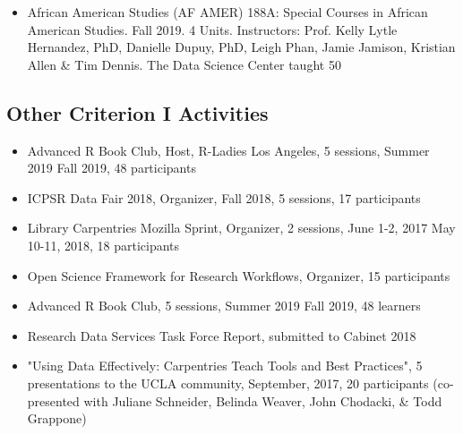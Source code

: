 \begin{itemize}[label={},leftmargin=!,labelindent=5pt,itemindent=-15pt]
    \item African American Studies (AF AMER) 188A: Special Courses in African American Studies. Fall 2019. 4 Units. Instructors: Prof. Kelly Lytle Hernandez, PhD, Danielle Dupuy, PhD, Leigh Phan, Jamie Jamison, Kristian Allen \& Tim Dennis. The Data Science Center taught 50%
\end{itemize}

\subsection{Other Criterion I Activities}
\begin{itemize}[label={},leftmargin=!,labelindent=5pt,itemindent=-15pt]
  \item Advanced R Book Club, Host, R-Ladies Los Angeles, 5 sessions, Summer 2019 \textbar Fall 2019,	48 participants
  \item ICPSR Data Fair 2018, Organizer, Fall 2018, 5 sessions, 17 participants
  \item Library Carpentries Mozilla Sprint, Organizer, 2 sessions, June 1-2, 2017 \textbar May 10-11, 2018, 18 participants
  \item Open Science Framework for Research Workflows, Organizer, 15 participants
  \item Advanced R Book Club, 5 sessions, Summer 2019 \textbar Fall 2019,	48 learners
  \item Research Data Services Task Force Report, submitted to Cabinet 2018
  \item "Using Data Effectively: Carpentries Teach Tools and Best Practices", 5 presentations to the UCLA community, September, 2017,	20 participants (co-presented with Juliane Schneider, Belinda Weaver, John Chodacki, \& Todd Grappone)
\end{itemize}
